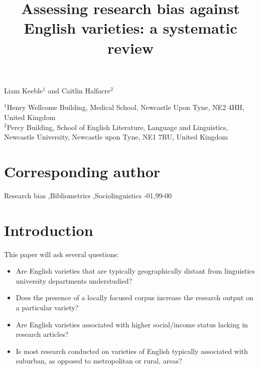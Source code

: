 \documentclass[review]{elsarticle}
\begin{document}
\begin{frontmatter}

\title{Assessing research bias against English varieties: a systematic review}


Liam Keeble$^{1}$ and Caitlin Halfacre$^{2}$


$^{1}$Henry Wellcome Building, Medical School, Newcastle Upon Tyne, NE2 4HH, United Kingdom\\
$^{2}$Percy Building, School of English Literature, Language and Linguistics, Newcastle University, Newcastle upon Tyne, NE1 7RU, United Kingdom\\

\section*{Corresponding author}



\begin{abstract}


\end{abstract}

\begin{keyword}
Research bias \sep Bibliometrics \sep Sociolinguistics 
-01\sep  99-00
\end{keyword}

\end{frontmatter}


\linenumbers

\section{Introduction}


This paper will ask several questions: 


\begin{itemize} 


\item Are English varieties that are typically geographically distant from linguistics university departments understudied?

\item Does the presence of a locally focused corpus increase the research output on a particular variety? 

\item Are English varieties associated with higher social/income status lacking in research articles?

\item Is most research conducted on varieties of English typically associated with suburban, as opposed to metropolitan or rural, areas?


\end{itemize}
\end{document}
